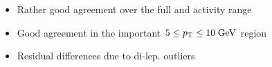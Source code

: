 \documentclass{beamer}
\begin{document}
\begin{frame}
\begin{columns}
\begin{column}{0.33\textwidth}
   \end{column}
  \end{columns}
  \begin{itemize}
   \item Rather good agreement over the full \pt and activity range
   \item Good agreement in the important $5\leq p_{\text{T}}\leq10\;\text{Ge}\kern-0.06667em\text{V}$ region
   \item Residual differences due to di-lep. outliers \ttbar
  \end{itemize}


\end{frame}
\end{document}
